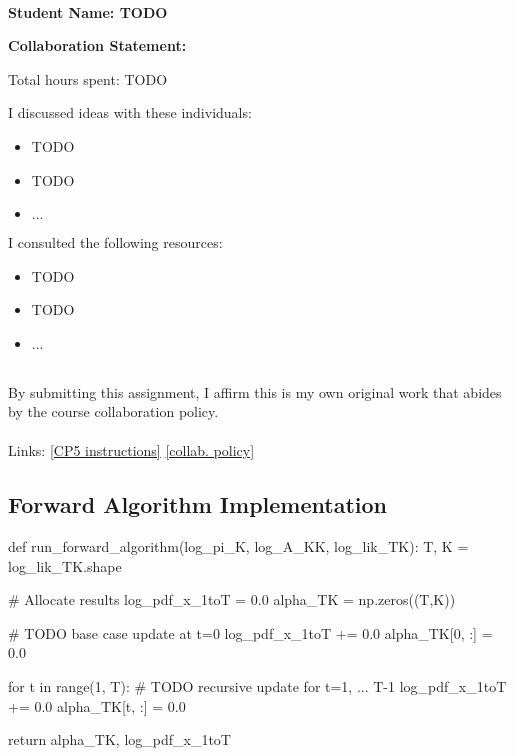 \documentclass[10pt]{article}
\begin{document}
~~\\ %

{\Large{\bf Student Name: TODO}}

\Large{\bf Collaboration Statement:}

Total hours spent: TODO

I discussed ideas with these individuals:
\begin{itemize}
\item TODO
\item TODO
\item $\ldots$	
\end{itemize}

I consulted the following resources:
\begin{itemize}
\item TODO
\item TODO
\item $\ldots$	
\end{itemize}
~~\\
By submitting this assignment, I affirm this is my own original work that abides by the course collaboration policy.
~~\\
~~\\
Links: 
\href{https://www.cs.tufts.edu/cs/136/2023s/cp5.html}{[CP5 instructions]} 
\href{https://www.cs.tufts.edu/cs/136/2023s/index.html#collaboration}{[collab. policy]} 

\tableofcontents

\newpage

\subsection{Forward Algorithm Implementation}
\begin{python}
def run_forward_algorithm(log_pi_K, log_A_KK, log_lik_TK):
	T, K = log_lik_TK.shape
	
	# Allocate results
	log_pdf_x_1toT = 0.0
	alpha_TK = np.zeros((T,K))

	# TODO base case update at t=0
	log_pdf_x_1toT += 0.0
	alpha_TK[0, :] = 0.0

	for t in range(1, T):
		# TODO recursive update for t=1, ... T-1
		log_pdf_x_1toT += 0.0
		alpha_TK[t, :] = 0.0

	return alpha_TK, log_pdf_x_1toT
\end{python}
\end{document}
